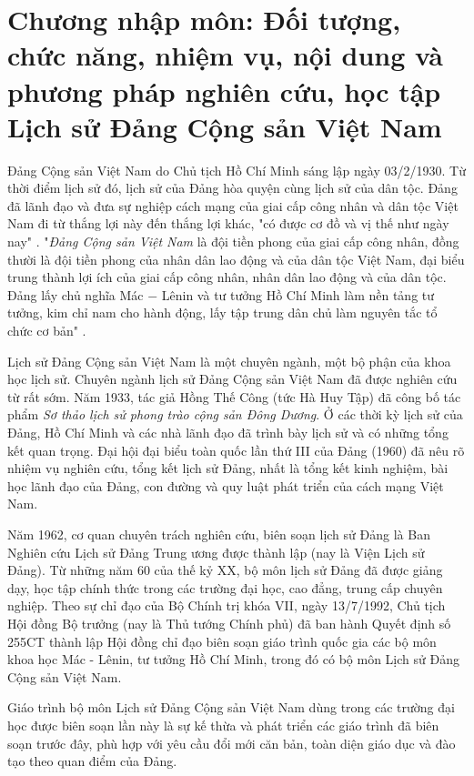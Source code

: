 \chapter{Chương nhập môn: Đối tượng, chức năng, nhiệm vụ, nội dung và phương pháp nghiên cứu, học tập Lịch sử Đảng Cộng sản Việt Nam}
Đảng Cộng sản Việt Nam do Chủ tịch Hồ Chí Minh sáng lập ngày 03/2/1930. Từ thời điểm lịch sử đó, lịch sử của Đảng hòa quyện cùng lịch sử của dân tộc. Đảng đã lãnh đạo và đưa sự nghiệp cách mạng của giai cấp công nhân và dân tộc Việt Nam đi từ thắng lợi này đến thắng lợi khác, "có được cơ đồ và vị thế như ngày nay" . "\textit{Đảng Cộng sản Việt Nam} là đội tiền phong của giai cấp công nhân, đồng thười là đội tiền phong của nhân dân lao động và của dân tộc Việt Nam, đại biểu trung thành lợi ích của giai cấp công nhân, nhân dân lao động và của dân tộc. Đảng lấy chủ nghĩa Mác $-$ Lênin và tư tưởng Hồ Chí Minh làm nền tảng tư tưởng, kim chỉ nam cho hành động, lấy tập trung dân chủ làm nguyên tắc tổ chức cơ bản" .

Lịch sử Đảng Cộng sản Việt Nam là một chuyên ngành, một bộ phận của khoa học lịch sử. Chuyên ngành lịch sử Đảng Cộng sản Việt Nam đã được nghiên cứu từ rất sớm. Năm 1933, tác giả Hồng Thế Công (tức Hà Huy Tập) đã công bố tác phẩm \textit{Sơ thảo lịch sử phong trào cộng sản Đông Dương}. Ở các thời kỳ lịch sử của Đảng, Hồ Chí Minh và các nhà lãnh đạo đã trình bày lịch sử và có những tổng kết quan trọng. Đại hội đại biểu toàn quốc lần thứ III của Đảng (1960) đã nêu rõ nhiệm vụ nghiên cứu, tổng kết lịch sử Đảng, nhất là tổng kết kinh nghiệm, bài học lãnh đạo của Đảng, con đường và quy luật phát triển của cách mạng Việt Nam.

Năm 1962, cơ quan chuyên trách nghiên cứu, biên soạn lịch sử Đảng là Ban Nghiên cứu Lịch sử Đảng Trung ương được thành lập (nay là Viện Lịch sử Đảng). Từ những năm 60 của thế kỷ XX, bộ môn lịch sử Đảng đã được giảng dạy, học tập chính thức trong các trường đại học, cao đẳng, trung cấp chuyên nghiệp. Theo sự chỉ đạo của Bộ Chính trị khóa VII, ngày 13/7/1992, Chủ tịch Hội đồng Bộ trưởng (nay là Thủ tướng Chính phủ) đã ban hành Quyết định số 255CT thành lập Hội đồng chỉ đạo biên soạn giáo trình quốc gia các bộ môn khoa học Mác - Lênin, tư tưởng Hồ Chí Minh, trong đó có bộ môn Lịch sử Đảng Cộng sản Việt Nam.

Giáo trình bộ môn Lịch sử Đảng Cộng sản Việt Nam dùng trong các trường đại học được biên soạn lần này là sự kế thừa và phát triển các giáo trình đã biên soạn trước đây, phù hợp với yêu cầu đổi mới căn bản, toàn diện giáo dục và đào tạo theo quan điểm của Đảng.



